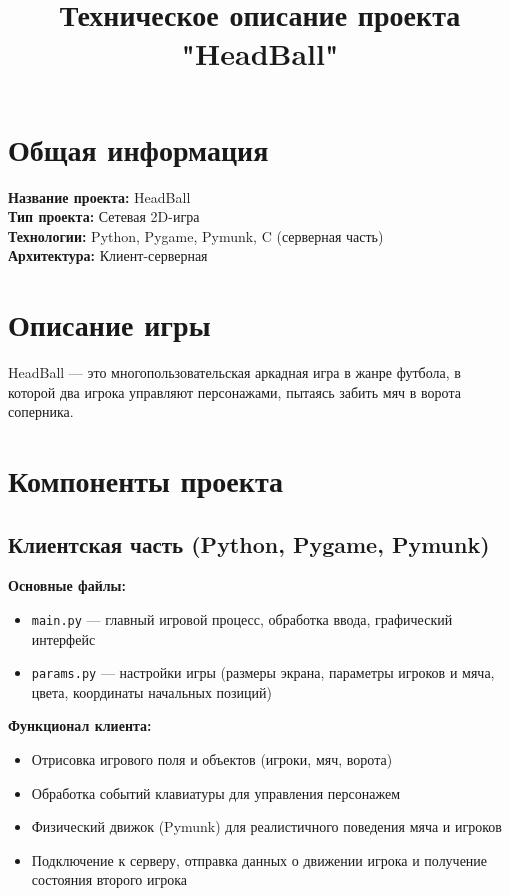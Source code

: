 \documentclass{article}
\title{Техническое описание проекта "HeadBall"}
\author{}
\date{}
\begin{document}
\maketitle

\section{Общая информация}
\textbf{Название проекта:} HeadBall  \\
\textbf{Тип проекта:} Сетевая 2D-игра  \\
\textbf{Технологии:} Python, Pygame, Pymunk, C (серверная часть)  \\
\textbf{Архитектура:} Клиент-серверная  

\section{Описание игры}
HeadBall — это многопользовательская аркадная игра в жанре футбола, в которой два игрока управляют персонажами, пытаясь забить мяч в ворота соперника.

\section{Компоненты проекта}
\subsection{Клиентская часть (Python, Pygame, Pymunk)}
\textbf{Основные файлы:}
\begin{itemize}
    \item \texttt{main.py} — главный игровой процесс, обработка ввода, графический интерфейс
    \item \texttt{params.py} — настройки игры (размеры экрана, параметры игроков и мяча, цвета, координаты начальных позиций)
\end{itemize}

\textbf{Функционал клиента:}
\begin{itemize}
    \item Отрисовка игрового поля и объектов (игроки, мяч, ворота)
    \item Обработка событий клавиатуры для управления персонажем
    \item Физический движок (Pymunk) для реалистичного поведения мяча и игроков
    \item Подключение к серверу, отправка данных о движении игрока и получение состояния второго игрока
\end{itemize}
\end{document}
